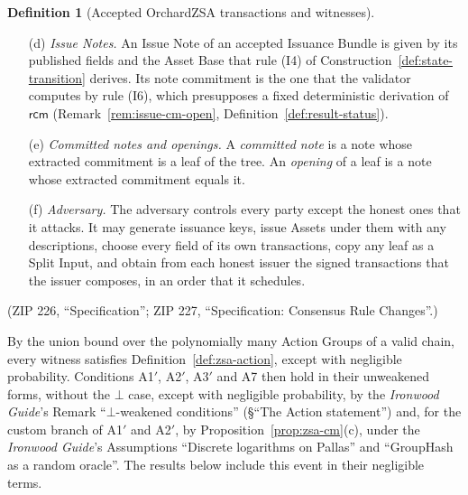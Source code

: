 \documentclass[11pt,a4paper]{article}
\theoremstyle{definition}
\newtheorem{definition}[theorem]{Definition}
\newcommand{\pkd}{\ensuremath{\mathsf{pk_d}}}
\newcommand{\gd}{\ensuremath{\mathsf{g_d}}}
\newcommand{\rcm}{\ensuremath{\mathsf{rcm}}}
\begin{document}
\begin{definition}[Accepted OrchardZSA transactions and witnesses]
\begin{enumerate}
  the note
  \[
    (\gd^{\mathsf{new}}, \pkd^{\mathsf{new}}, v^{\mathsf{new}},
    \mathsf{AssetBase}, \rho^{\mathsf{new}}, \psi^{\mathsf{new}},
    \rcm^{\mathsf{new}}),
  \]
  with $\rho^{\mathsf{new}}$ the published nullifier. Notes are given by
  expanded receivers as in item~(d) of the cited definition. An accepted
  Action with $\mathsf{split\_flag} = 0$ is a \emph{real spend} of its
  consumed note; one with $\mathsf{split\_flag} = 1$ is a Split Action
  (Definition~\ref{def:split-input}). The shared pool also admits
  Orchard-protocol Actions (ZIP 226, ``Privacy Implications''); the
  witness of such an Action is that of the \emph{Ironwood Guide}'s
  Assumption ``Knowledge soundness of the Action proof'', and every such
  Action is a real spend.
\item[(d)] \emph{Issue Notes.} An Issue Note of an accepted Issuance Bundle
  is given by its published fields and the Asset Base that rule (I4) of
  Construction~\ref{def:state-transition} derives. Its note commitment is
  the one that the validator computes by rule (I6), which presupposes a
  fixed deterministic derivation of $\rcm$
  (Remark~\ref{rem:issue-cm-open}, Definition~\ref{def:result-status}).
\item[(e)] \emph{Committed notes and openings.} A \emph{committed note} is
  a note whose extracted commitment is a leaf of the tree. An
  \emph{opening} of a leaf is a note whose extracted commitment equals it.
\item[(f)] \emph{Adversary.} The adversary controls every party except the
  honest ones that it attacks. It may generate issuance keys, issue Assets
  under them with any descriptions, choose every field of its own
  transactions, copy any leaf as a Split Input, and obtain from each honest
  issuer the signed transactions that the issuer composes, in an order that
  it schedules.
\end{enumerate}
(ZIP 226, ``Specification''; ZIP 227, ``Specification: Consensus Rule
Changes''.)
\end{definition}

By the union bound over the polynomially many Action Groups of a valid
chain, every witness satisfies Definition~\ref{def:zsa-action}, except with
negligible probability. Conditions A1$'$, A2$'$, A3$'$ and A7 then hold in
their unweakened forms, without the $\bot$ case, except with negligible
probability, by the \emph{Ironwood Guide}'s Remark ``$\bot$-weakened
conditions'' (\S``The Action statement'') and, for the custom branch of
A1$'$ and A2$'$, by Proposition~\ref{prop:zsa-cm}(c), under the
\emph{Ironwood Guide}'s Assumptions ``Discrete logarithms on Pallas'' and
``GroupHash as a random oracle''. The results below include this event in
their negligible terms.
\end{document}
